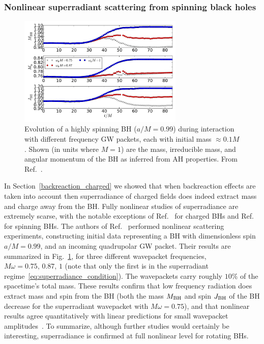 \documentclass[11pt]{article}
\numberwithin{equation}{section} %
\begin{document}
\subsubsection{Nonlinear superradiant scattering from spinning black holes}\label{sec:super_nonlinear}
%
\begin{figure}[htbp]
\centerline{\includegraphics[width=0.7\textwidth]{comp_ah_frans}}
\caption{Evolution of a highly spinning BH ($a/M=0.99$) during interaction with
different frequency GW packets, each with initial mass $\approx 0.1M$.  Shown
(in units where $M=1$) are the mass, irreducible mass, and angular momentum of
the BH as inferred from AH properties. From Ref.~\cite{East:2013mfa}.}
\label{fig:ah_fig}
\end{figure}
%
In Section~\ref{backreaction_charged} we showed that when backreaction effects are taken into account then superradiance of charged fields does indeed extract mass and charge away from the BH. Fully nonlinear studies of superradiance are extremely scarse, with the notable exceptions of Ref.~\cite{Baake:2016oku} for charged BHs and Ref.~\cite{East:2013mfa} for spinning BHs.
The authors of Ref.~\cite{East:2013mfa} performed nonlinear scattering experiments, constructing initial data
representing a BH with dimensionless spin $a/M=0.99$, and an incoming
quadrupolar GW packet. Their results are summarized in Fig.~\ref{fig:ah_fig}, for three different wavepacket frequencies,
$M\omega=0.75,\,0.87,\,1$ (note that only the first is in the superradiant regime~\eqref{eq:superradiance_condition}). 
The wavepackets carry roughly $10\%$ of the spacetime's total mass. These results confirm that low frequency radiation does
extract mass and spin from the BH (both the mass $M_{\rm BH}$ and spin $J_{\rm BH}$ of the BH decrease for the superradiant wavepacket with $M\omega=0.75$), and that nonlinear results agree quantitatively with linear predictions for small wavepacket amplitudes~\cite{Teukolsky:1974yv}. To summarize, although further studies would certainly be interesting, superradiance is confirmed at full nonlinear level for rotating BHs.
\end{document}
